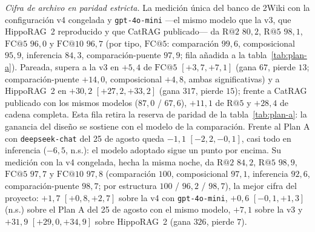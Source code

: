 \documentclass[11pt,a4paper]{article}
\newcommand{\hippo}{HippoRAG~2}
\begin{document}
\emph{Cifra de archivo en paridad estricta.} La medición única del banco de
2Wiki con la configuración v4 congelada y \texttt{gpt-4o-mini} ---el mismo
modelo que la v3, que \hippo{} reproducido y que CatRAG publicado--- da
$\mathrm{R@}2$ $80{,}2$, $\mathrm{R@}5$ $98{,}1$, $\mathrm{FC@}5$ $96{,}0$ y
$\mathrm{FC@}10$ $96{,}7$ (por tipo, $\mathrm{FC@}5$: comparación $99{,}6$,
composicional $95{,}9$, inferencia $84{,}3$, comparación-puente $97{,}9$; fila
añadida a la tabla~\ref{tab:plan-a}). Pareada, supera a la v3 en $+5{,}4$ de
$\mathrm{FC@}5$ $[+3{,}7,+7{,}1]$ (gana $67$, pierde $13$; comparación-puente
$+14{,}0$, composicional $+4{,}8$, ambas significativas) y a \hippo{} en
$+30{,}2$ $[+27{,}2,+33{,}2]$ (gana $317$, pierde $15$); frente a CatRAG
publicado con los mismos modelos ($87{,}0$ / $67{,}6$), $+11{,}1$ de
$\mathrm{R@}5$ y $+28{,}4$ de cadena completa. Esta fila retira la reserva de
paridad de la tabla~\ref{tab:plan-a}: la ganancia del diseño se sostiene con
el modelo de la comparación. Frente al Plan A con \texttt{deepseek-chat} del
25 de agosto queda $-1{,}1$ $[-2{,}2,-0{,}1]$, casi todo en inferencia
($-6{,}5$, n.s.): el modelo adoptado sigue un punto por encima. Su medición
con la v4 congelada, hecha la misma noche, da $\mathrm{R@}2$ $84{,}2$,
$\mathrm{R@}5$ $98{,}9$, $\mathrm{FC@}5$ $97{,}7$ y $\mathrm{FC@}10$
$97{,}8$ (comparación $100$, composicional $97{,}1$, inferencia $92{,}6$,
comparación-puente $98{,}7$; por estructura $100$ / $96{,}2$ / $98{,}7$),
la mejor cifra del proyecto: $+1{,}7$ $[+0{,}8,+2{,}7]$ sobre la v4 con
\texttt{gpt-4o-mini}, $+0{,}6$ $[-0{,}1,+1{,}3]$ (n.s.) sobre el Plan A del
25 de agosto con el mismo modelo, $+7{,}1$ sobre la v3 y $+31{,}9$
$[+29{,}0,+34{,}9]$ sobre \hippo{} (gana $326$, pierde $7$).
\end{document}
